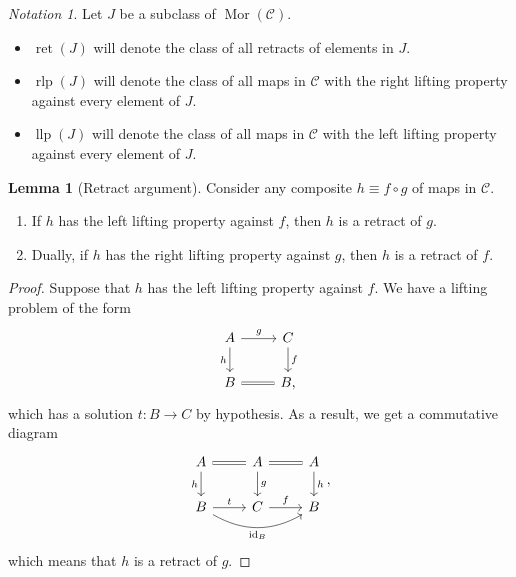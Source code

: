 \documentclass[10pt,letterpaper,cm]{nupset}
\theoremstyle{definition}
\theoremstyle{theorem}
\newtheorem{lemma}[definition]{Lemma}
\theoremstyle{remark}
\newtheorem*{notation}{Notation}
\DeclareMathOperator{\mor}{Mor}
\newcommand{\0}{\mathbf{0}}
\newcommand{\1}{\mathbf{1}}
\newcommand{\2}{\mathbf{2}}
\renewcommand{\c}{\mathscr{C}}
\DeclareMathOperator{\idd}{id}
\DeclareMathOperator{\ret}{ret}
\DeclareMathOperator{\rlp}{rlp}
\DeclareMathOperator{\llp}{llp}
\newcommand{\bi}{\begin{itemize}}
\newcommand{\ei}{\end{itemize}}
\newcommand{\be}{\begin{enumerate}}
\newcommand{\ee}{\end{enumerate}}
\begin{document}
\smallskip

\begin{notation} Let $J$ be a subclass of $\mor(\c)$.
\bi
\item $\ret(J)$ will denote the class of all retracts of elements in $J$.
\item $\rlp(J)$ will denote the class of all maps in $\c$ with the right lifting property against every element of $J$.
\item $\llp(J)$ will denote the class of all maps in $\c$ with the left lifting property against every element of $J$.
\ei
\end{notation}

\smallskip

\begin{lemma}[Retract argument]\label{RA}
Consider any composite $h \equiv f \circ g$ of maps in $\c$.
\be[label=(\alph*)]
\item If $h$ has the left lifting property against $f$, then $h$ is a retract of $g$.
\item Dually, if $h$ has the right lifting property against $g$, then $h$ is a retract of $f$.
\ee
\end{lemma}
\begin{proof}
Suppose that $h$ has the left lifting property against $f$. We have a lifting problem of the form
\[
\begin{tikzcd}
A \arrow[d, "h"'] \arrow[r, "g"] & C \arrow[d, "f"] \\
B \arrow[r, equals]                      & B               
,\end{tikzcd}
\] which has a solution $t: B \to C$ by hypothesis.  As a result, we get a commutative diagram
\[
\begin{tikzcd}
A \arrow[r, equals] \arrow[d, "h"']                        & A \arrow[r, equals] \arrow[d, "g"] & A \arrow[d, "h"] \\
B \arrow[r, "t"] \arrow[rr, "\idd_B"', bend right] & C \arrow[r, "f"]           & B               
\end{tikzcd}
,\] which means that $h$ is a retract of $g$. 
\end{proof}
\end{document}
